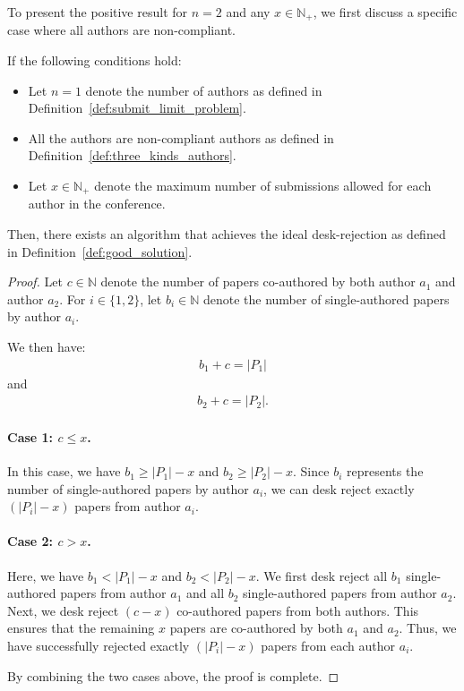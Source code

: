 To present the positive result for $n=2$ and any $x \in \mathbb{N}_+$, we first discuss a specific case where all authors are non-compliant.

\begin{lemma} [Positive result for $n=2$ and any $x\in\mathbb{N}_+$, non-compliant author only case] \label{lem:n_eq_2_positive}
If the following conditions hold:
\begin{itemize}
    \item Let $n = 1$ denote the number of authors as defined in Definition~\ref{def:submit_limit_problem}.
    \item All the authors are non-compliant authors as defined in Definition~\ref{def:three_kinds_authors}.
    \item Let $x \in \mathbb{N}_+$ denote the maximum number of submissions allowed for each author in the conference. 
\end{itemize}

Then, there exists an algorithm that achieves the ideal desk-rejection as defined in Definition~\ref{def:good_solution}.
\end{lemma}

\begin{proof}
Let $c \in \mathbb{N}$ denote the number of papers co-authored by both author $a_1$ and author $a_2$. For $i \in \{1, 2\}$, let $b_i \in \mathbb{N}$ denote the number of single-authored papers by author $a_i$. 

We then have:
\begin{align*}
    b_1 + c = |P_1|
\end{align*}
and
\begin{align*}
    b_2 + c = |P_2|.
\end{align*}

\paragraph{Case 1: $c \leq x$.} 
In this case, we have $b_1 \geq |P_1| - x$ and $b_2 \geq |P_2| - x$. Since $b_i$ represents the number of single-authored papers by author $a_i$, we can desk reject exactly $(|P_i| - x)$ papers from author $a_i$.

\paragraph{Case 2: $c > x$.} 
Here, we have $b_1 < |P_1| - x$ and $b_2 < |P_2| - x$. We first desk reject all $b_1$ single-authored papers from author $a_1$ and all $b_2$ single-authored papers from author $a_2$. Next, we desk reject $(c - x)$ co-authored papers from both authors. This ensures that the remaining $x$ papers are co-authored by both $a_1$ and $a_2$. Thus, we have successfully rejected exactly $(|P_i| - x)$ papers from each author $a_i$.

By combining the two cases above, the proof is complete.
\end{proof}

